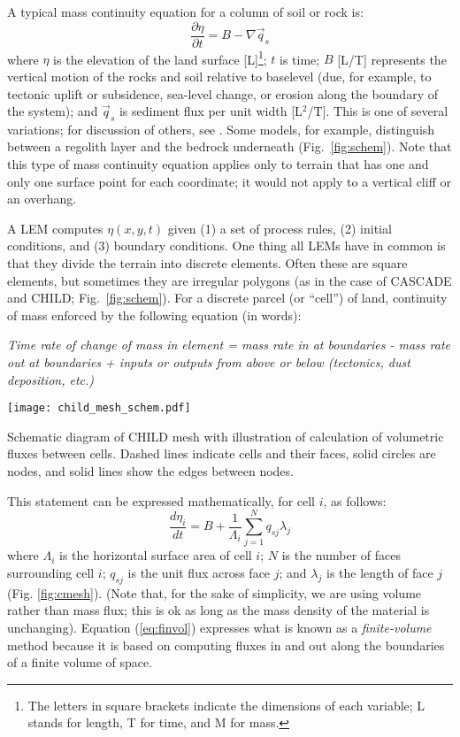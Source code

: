 \documentclass[12pt,reqno]{amsart}
\begin{document}
A typical mass continuity equation for a column of soil or rock is:
\begin{equation}
\frac{\partial \eta}{\partial t} = B - \nabla \vec{q}_s
\end{equation}
where $\eta$ is the elevation of the land surface [L]\footnote{The letters in square brackets indicate the dimensions of each variable; L stands for length, T for time, and M for mass.}; $t$ is time; $B$ [L/T] represents the vertical motion of the rocks and soil relative to baselevel (due, for example, to tectonic uplift or subsidence, sea-level change, or erosion along the boundary of the system); and $\vec{q}_s$ is sediment flux per unit width [L$^2$/T]. This is one of several variations; for discussion of others, see \cite{tucker2010modelling}. Some models, for example, distinguish between a regolith layer and the bedrock underneath (Fig.~\ref{fig:schem}). Note that this type of mass continuity equation applies only to terrain that has one and only one surface point for each coordinate; it would not apply to a vertical cliff or an overhang.

A LEM computes $\eta (x,y,t)$ given (1) a set of process rules, (2) initial conditions, and (3) boundary conditions.
One thing all LEMs have in common is that they divide the terrain into discrete elements. Often these are square elements, but sometimes they are irregular polygons (as in the case of CASCADE and CHILD; Fig.~\ref{fig:schem}).
For a discrete parcel (or ``cell'') of land, continuity of mass enforced by the following equation (in words):

{\em Time rate of change of mass in element = mass rate in at boundaries - mass rate out at boundaries + inputs or outputs from above or below (tectonics, dust deposition, etc.)}

\begin{floatingfigure}{171pt}
\centering
\texttt{[image: child\_mesh\_schem.pdf]}
\captionsetup{width=154pt}
\caption{Schematic diagram of CHILD mesh with illustration of calculation of volumetric fluxes between cells. Dashed lines indicate cells and their faces, solid circles are nodes, and solid lines show the edges between nodes.}
\label{fig:cmesh}
\end{floatingfigure}

This statement can be expressed mathematically, for cell $i$, as follows:
\begin{equation}
\label{eq:finvol}
\frac{d\eta_i}{dt} = B + \frac{1}{\Lambda_i} \sum_{j=1}^N q_{sj} \lambda_j
\end{equation}
where $\Lambda_i$ is the horizontal surface area of cell $i$; $N$ is the number of faces surrounding cell $i$; $q_{sj}$ is the unit flux across face $j$; and $\lambda_j$ is the length of face $j$ (Fig. \ref{fig:cmesh}). (Note that, for the sake of simplicity, we are using volume rather than mass flux; this is ok as long as the mass density of the material is unchanging). Equation (\ref{eq:finvol}) expresses what is known as a {\em finite-volume} method because it is based on computing fluxes in and out along the boundaries of a finite volume of space.
\end{document}
